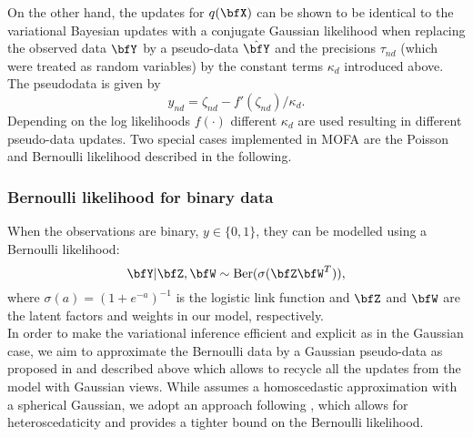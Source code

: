 On the other hand, the updates for $q(\bfX)$ can be shown to be identical to the variational Bayesian updates with a conjugate Gaussian likelihood when replacing the observed data $\bfY$ by a pseudo-data $\hat{\bfY}$ and the precisions $\tau_{nd}$ (which were treated as random variables) by the constant terms $\kappa_d$ introduced above.\\
The pseudodata is given by
\begin{equation*}
\hat{y}_{nd} = \zeta_{nd} - f'(\zeta_{nd})/\kappa_d.
\end{equation*}
Depending on the log likelihoods $f(\cdot)$ different $\kappa_d$ are used resulting in different pseudo-data updates. Two special cases implemented in MOFA are the Poisson and Bernoulli likelihood described in the following.

\subsubsection*{Bernoulli likelihood for binary data}
When the observations are binary, $y \in \{0,1\}$, they can be modelled using a Bernoulli likelihood:
\begin{equation*}
\bfY|\bfZ,\bfW \sim \text{Ber}(\sigma(\bfZ\bfW^T)),
\end{equation*} where $\sigma(a)=(1+e^{-a})^{-1}$ is the logistic link function and $\bfZ$ and $\bfW$ are the latent factors and weights in our model, respectively.\\
In order to make the variational  inference efficient and explicit as in the Gaussian case, we aim to approximate the Bernoulli data by a Gaussian pseudo-data as proposed in \cite{seeger} and described above which allows to recycle all the updates from the model with Gaussian views. While \cite{seeger} assumes a homoscedastic approximation with a spherical Gaussian, we adopt an approach following \cite{Jaakkola}, which allows for heteroscedaticity and provides a tighter bound on the Bernoulli likelihood.\\
